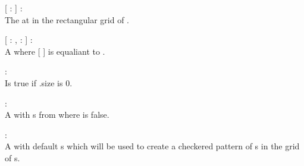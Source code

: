 \begin{dlist}
  \item {}[  :  ] : \\
  The  at  in the rectangular grid of .
  
  \item {}[  : ,  :  ] : \\
  A  where [  ] is equaliant to .
  
  \item {} : \\
  Is true if .size is 0.
  
  \item {} : \\
  A  with s from  where  is false.
  
  \item {} : \\
  A  with default s which will be used to create a checkered pattern of s in the grid of s.
\end{dlist}

